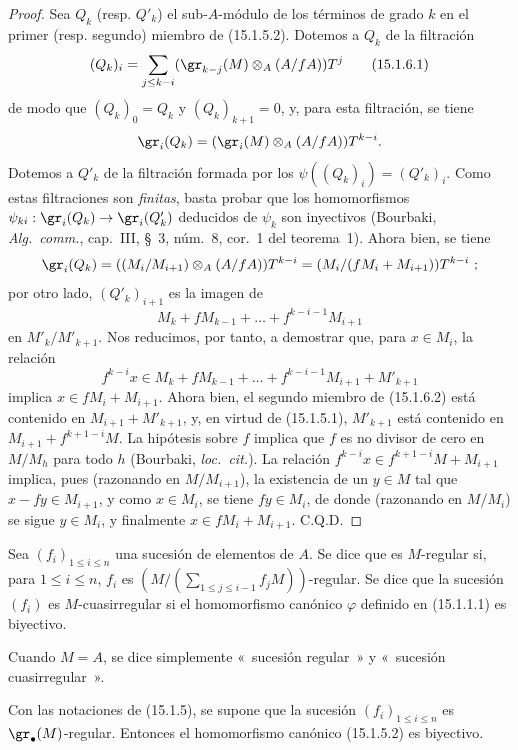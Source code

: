 \begin{proof}
Sea $Q_k$ (resp. $Q'_k$) el sub-$A$-módulo de los términos de grado $k$ en
el primer (resp. segundo) miembro de (15.1.5.2). Dotemos a $Q_k$ de la filtración
\[
  (Q_k)_i=\sum_{j\leq k-i}
  (\gr_{k-j}(M)\otimes_A(A/fA))T^j
  \tag{15.1.6.1}\label{0.15.1.6.1-es}
\]
de modo que $(Q_k)_0=Q_k$ y $(Q_k)_{k+1}=0$, y, para esta filtración, se tiene
\[
  \gr_i(Q_k)=(\gr_i(M)\otimes_A(A/fA))T^{k-i}.
\]
Dotemos a $Q'_k$ de la filtración formada por los
$\psi((Q_k)_i)=(Q'_k)_i$. Como estas filtraciones son \emph{finitas}, basta
probar que los homomorfismos $\psi_{ki}:\gr_i(Q_k)\to\gr_i(Q'_k)$ deducidos de
$\psi_k$ son inyectivos (Bourbaki, \emph{Alg.~comm.}, cap.~III, \S~3,
núm.~8, cor.~1 del teorema~1). Ahora bien, se tiene
\[
  \gr_i(Q_k)=((M_i/M_{i+1})\otimes_A(A/fA))T^{k-i}=(M_i/(fM_i+M_{i+1}))T^{k-i}~;
\]
por otro lado, $(Q'_k)_{i+1}$ es la imagen de
\[
  M_k+fM_{k-1}+\ldots+f^{k-i-1}M_{i+1}
\]
en $M'_k/M'_{k+1}$. Nos reducimos, por tanto, a demostrar que, para $x\in M_i$,
la relación
\[
  f^{k-i}x\in M_k+fM_{k-1}+\ldots+
  f^{k-i-1}M_{i+1}+M'_{k+1}
  \tag{15.1.6.2}\label{0.15.1.6.2-es}
\]
implica $x\in fM_i+M_{i+1}$. Ahora bien, el segundo miembro de (15.1.6.2) está
contenido en $M_{i+1}+M'_{k+1}$, y, en virtud de (15.1.5.1), $M'_{k+1}$ está
contenido en $M_{i+1}+f^{k+1-i}M$. La hipótesis sobre $f$ implica que $f$ es
no divisor de cero en $M/M_h$ para todo $h$ (Bourbaki, \emph{loc.~cit.}). La
relación $f^{k-i}x\in f^{k+1-i}M+M_{i+1}$ implica, pues (razonando en
$M/M_{i+1}$), la existencia de un $y\in M$ tal que $x-fy\in M_{i+1}$, y como
$x\in M_i$, se tiene $fy\in M_i$, de donde (razonando en $M/M_i$) se sigue
$y\in M_i$, y finalmente $x\in fM_i+M_{i+1}$. C.Q.D.
\end{proof}

\begin{definition}[15.1.7]
\label{0.15.1.7-es}
Sea $(f_i)_{1\leq i\leq n}$ una sucesión de elementos de $A$. Se dice que es
$M$-regular si, para $1\leq i\leq n$, $f_i$ es
$\left(M/(\sum_{1\leq j\leq i-1}f_jM)\right)$-regular. Se dice que la sucesión
$(f_i)$ es $M$-cuasirregular si el homomorfismo canónico $\varphi$
definido en (15.1.1.1) es biyectivo.

Cuando $M=A$, se dice simplemente «~sucesión regular~» y
«~sucesión cuasirregular~».
\end{definition}

\begin{proposition}[15.1.8]
\label{0.15.1.8-es}
Con las notaciones de (15.1.5), se supone que la sucesión
$(f_i)_{1\leq i\leq n}$ es $\gr_\bullet(M)$-regular. Entonces
el homomorfismo canónico (15.1.5.2) es biyectivo.
\end{proposition}


